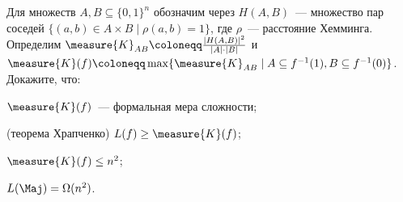 Для множеств $A, B \subseteq \{0, 1\}^n$ обозначим через $H(A, B)$~--- множество пар соседей $\{(a, b)
\in A \times B \mid \rho(a, b) = 1\}$, где $\rho$~--- расстояние Хемминга. Определим $\measure{K}_{AB}
\coloneqq \frac{|H(A, B)|^2}{|A| \cdot |B|}$ и $\measure{K}(f) \coloneqq \max \{\measure{K}_{AB} \mid A
\subseteq f^{-1}(1), B \subseteq f^{-1}(0)\}$. Докажите, что:
\begin{enumcyr}
    \item $\measure{K}(f)$~--- формальная мера сложности;
    \item (теорема Храпченко) $L(f) \ge \measure{K}(f)$;
    \item $\measure{K}(f) \le n^2$;
    \item $L(\Maj) = \Omega(n^2)$.
\end{enumcyr}